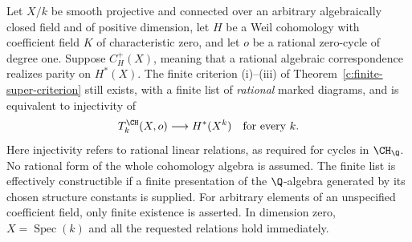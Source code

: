 \begin{corollary}
\label{c:finite-weil-criterion}
Let $X/k$ be smooth projective and connected over an arbitrary
algebraically closed field and of positive dimension, let $H$ be a
Weil cohomology with coefficient field $K$ of characteristic zero,
and let $o$ be a
rational zero-cycle of degree one.  Suppose $C^+_H(X)$, meaning
that a rational algebraic correspondence realizes parity on
$H^*(X)$.  The finite criterion (i)--(iii) of
Theorem~\ref{c:finite-super-criterion} still exists, with a finite
list of \emph{rational} marked diagrams, and is equivalent to
injectivity of
\[
 T_k^{\CH}(X,o)\longrightarrow H^*(X^k)
 \quad\hbox{for every }k.
\]
Here injectivity refers to rational linear relations, as required
for cycles in $\CH_\Q$.  No rational form of the whole cohomology
algebra is assumed.  The finite list is effectively constructible
if a finite presentation of the $\Q$-algebra generated by its
chosen structure constants is supplied.  For arbitrary elements
of an unspecified coefficient field, only finite existence is
asserted.  In dimension zero, $X=\operatorname{Spec}(k)$ and
all the requested relations hold immediately.
\end{corollary}

